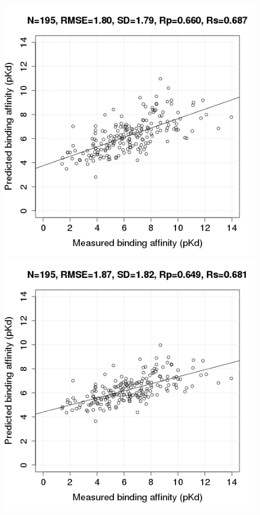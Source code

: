 \documentclass[journal=jacsat,manuscript=article]{achemso}
\begin{document}
\begin{figure}
\includegraphics[width=1.4\linewidth,natwidth=480,natheight=480]{../rfcyscore/x4/mlr/trn-247-tst-195-yp.png}
\endminipage\hfill
{}
\includegraphics[width=1.4\linewidth,natwidth=480,natheight=480]{../rfcyscore/x4/mlr/trn-1105-tst-195-yp.png}

\end{figure}
\end{document}
